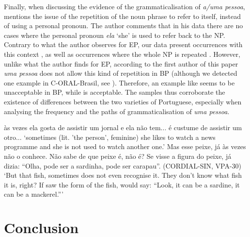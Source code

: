 \documentclass[output=paper]{langscibook}
\begin{document}
Finally, when discussing the evidence of the grammaticalisation of \textit{a/uma pessoa}, \citet[12]{Posio2021} mentions the issue of the repetition of the noun phrase to refer to itself, instead of using a personal pronoun. The author comments that in his data there are no cases where the personal pronoun \textit{ela} ‘she’ is used to refer back to the NP. Contrary to what the author observes for EP, our data present occurrences with this context , as well as occurrences where the whole NP is repeated . However, unlike what the author finds for EP, according to the first author of this paper \textit{uma pessoa} does not allow this kind of repetition in BP (although we detected one example in C-ORAL-Brasil, see \citealt{AmaralMihatsch2019}). Therefore, an example like  seems to be unacceptable in BP, while  is acceptable. The samples thus corroborate the existence of differences between the two varieties of Portuguese, especially when analysing the frequency and the paths of grammaticalisation of \textit{uma pessoa}.



\eanoraggedright\label{ex:amaral:40}
às vezes  ela gosta de assistir um jornal e ela não tem... é custume de assistir um otro... \citep{Amaral2015}
\glt `sometimes  (lit. 'the person', feminine)  she likes to watch a news programme and she is not used to watch another one.'
\ex\label{ex:amaral:41} 
Mas esse peixe, já  às vezes não o conhece. Não sabe de que peixe é, não é? Se  visse a figura do peixe, já  dizia: “Olha, pode ser a sardinha, pode ser carapau”. (CORDIAL-SIN, VPA-30)
\glt ‘But that fish, sometimes  does not even recognise it. They don’t know what fish it is, right? If  saw the form of the fish,  would say: “Look, it can be a sardine, it can be a mackerel.”’ \citep[13]{Posio2021}
\z 

\section{Conclusion}\label{sec:amaral:7}
\end{document}
